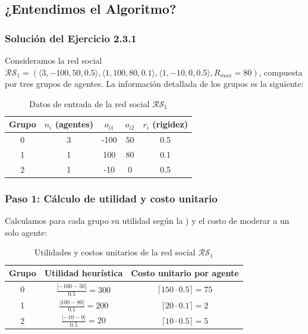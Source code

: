 \documentclass[11pt,letter]{article}
\begin{document}
\subsection{¿Entendimos el Algoritmo?}
\subsubsection{Solución del Ejercicio 2.3.1}

Consideramos la red social $\mathcal{RS}_1 = ( \langle 3, -100, 50, 0.5 \rangle, \langle 1, 100, 80, 0.1 \rangle, \langle 1, -10, 0, 0.5 \rangle, R_{max} = 80 )$, compuesta por tres grupos de agentes. La información detallada de los grupos es la siguiente:

\begin{table}[H]
\centering
\begin{tabular}{c|c|c|c|c}
\textbf{Grupo} & $n_i$ (agentes) & $o_{i1}$ & $o_{i2}$ & $r_i $ (rigidez) \\
\hline
0 & 3 & -100 & 50 & 0.5 \\
1 & 1 & 100 & 80 & 0.1 \\
2 & 1 & -10 & 0 & 0.5 \\
\end{tabular}
\caption{Datos de entrada de la red social $\mathcal{RS}_1$}
\end{table}

\subsubsection*{Paso 1: Cálculo de utilidad y costo unitario}

Calculamos para cada grupo su utilidad según la ) y el costo de moderar a un solo agente:

\begin{table}[H]
\centering
\begin{tabular}{c|c|c}
\textbf{Grupo} & Utilidad heurística & Costo unitario por agente \\
\hline
0 & $\frac{|-100 - 50|}{0.5} = 300$ & $\lceil 150 \cdot 0.5 \rceil = 75$ \\
1 & $\frac{|100 - 80|}{0.1} = 200$ & $\lceil 20 \cdot 0.1 \rceil = 2$ \\
2 & $\frac{|-10 - 0|}{0.5} = 20$ & $\lceil 10 \cdot 0.5 \rceil = 5$ \\
\end{tabular}
\caption{Utilidades y costos unitarios de la red social $\mathcal{RS}_1$}
\end{table}
\end{document}
